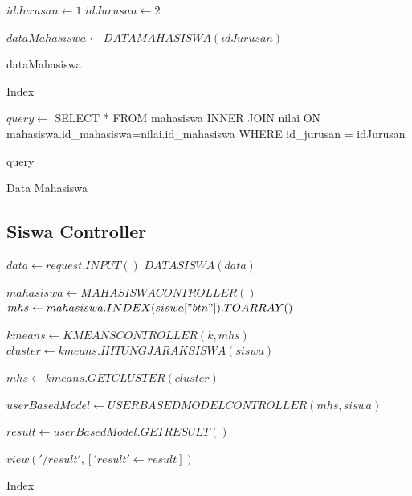 \begin{algorithm}[H]
  \begin{algorithmic}[1]
        \State $idJurusan \gets 1$ 
            \State $idJurusan \gets 2$
        \EndIf
        
        \State $dataMahasiswa \gets DATAMAHASISWA(idJurusan)$
        
        \State \Return dataMahasiswa
    \EndProcedure
  \end{algorithmic} 
  \caption{Index}
  \label{alg:index mahasiswa controller}
\end{algorithm}

\begin{algorithm}[H]
  \begin{algorithmic}[1]
        \State $query \gets$ SELECT * FROM mahasiswa INNER JOIN nilai ON mahasiswa.id\_mahasiswa=nilai.id\_mahasiswa WHERE id\_jurusan = idJurusan
        
        \State \Return query
    \EndProcedure
  \end{algorithmic} 
  \caption{Data Mahasiswa}
  \label{alg:data mahasiswa controller}
\end{algorithm}

\subsection{Siswa Controller}
\label{subsec:siswa controller}

\begin{algorithm}[H]
  \begin{algorithmic}[1]
        \State $data \gets request.INPUT()$
        \State $DATASISWA(data)$
        
        \State $mahasiswa \gets MAHASISWACONTROLLER()$
        \State $mhs \gets mahasiswa.INDEX(siswa["btn"]).TOARRAY()$
        
        \State $kmeans \gets KMEANSCONTROLLER(k, mhs)$ 
        \State $cluster \gets kmeans.HITUNGJARAKSISWA(siswa)$
        
        \State $mhs \gets kmeans.GETCLUSTER(cluster)$
        
        \State $userBasedModel \gets USERBASEDMODELCONTROLLER(mhs, siswa)$
        
        \State $result \gets userBasedModel.GETRESULT()$
        
        \State \Return $view('/result', ['result' \gets result])$
    \EndProcedure
  \end{algorithmic} 
  \caption{Index}
  \label{alg:index siswa controller}
\end{algorithm}

